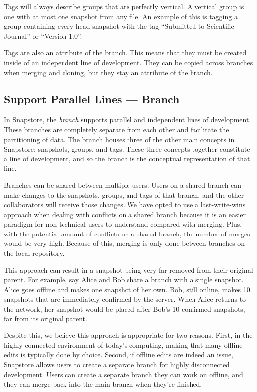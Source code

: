 Tags will always describe groups that are perfectly vertical. A vertical group is one with at most one snapshot from any file. An example of this is tagging a group containing every head snapshot with the tag ``Submitted to Scientific Journal'' or ``Version 1.0''.

Tags are also an attribute of the branch. This means that they must be created inside of an independent line of development. They can be copied across branches when merging and cloning, but they stay an attribute of the branch.

\subsection{Support Parallel Lines --- Branch}

In Snapstore, the \textit{branch} supports parallel and independent lines of development. These branches are completely separate from each other and facilitate the partitioning of data. The branch houses three of the other main concepts in Snapstore: snapshots, groups, and tags. These three concepts together constitute a line of development, and so the branch is the conceptual representation of that line.

Branches can be shared between multiple users. Users on a shared branch can make changes to the snapshots, groups, and tags of that branch, and the other collaborators will receive those changes. We have opted to use a last-write-wins approach when dealing with conflicts on a shared branch because it is an easier paradigm for non-technical users to understand compared with merging. Plus, with the potential amount of conflicts on a shared branch, the number of merges would be very high. Because of this, merging is only done between branches on the local repository.

This approach can result in a snapshot being very far removed from their original parent. For example, say Alice and Bob share a branch with a single snapshot. Alice goes offline and makes one snapshot of her own. Bob, still online, makes 10 snapshots that are immediately confirmed by the server. When Alice returns to the network, her snapshot would be placed after Bob's 10 confirmed snapshots, far from its original parent.

Despite this, we believe this approach is appropriate for two reasons. First, in the highly connected environment of today's computing, making that many offline edits is typically done by choice. Second, if offline edits are indeed an issue, Snapstore allows users to create a separate branch for highly disconnected development. Users can create a separate branch they can work on offline, and they can merge back into the main branch when they're finished.

